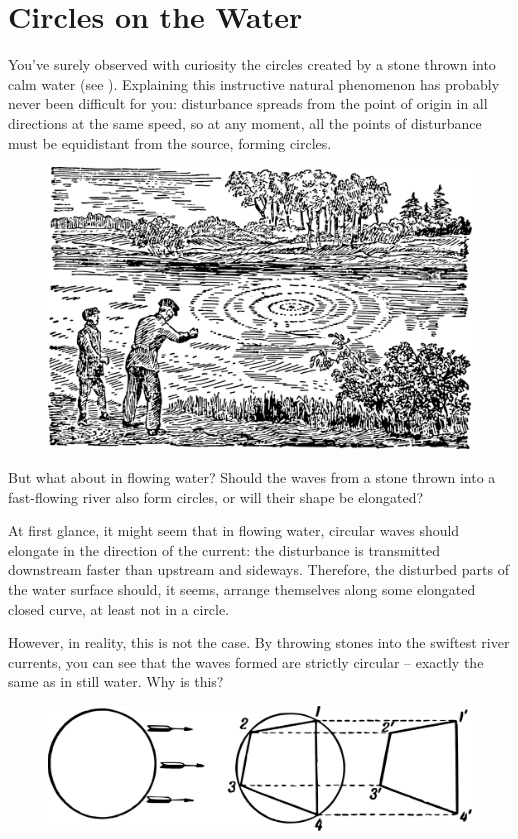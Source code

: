 \section{Circles on the Water}
\label{sec-2.11}
\ques You've surely observed with curiosity the circles created by a stone thrown into calm water (see ). Explaining this instructive natural phenomenon has probably never been difficult for you: disturbance spreads from the point of origin in all directions at the same speed, so at any moment, all the points of disturbance must be equidistant from the source, forming circles.

\begin{figure}[h!]
\centering
\includegraphics[width=\textwidth]{figures/ch-02/fig-046.pdf}
\end{figure}


But what about in flowing water? Should the waves from a stone thrown into a fast-flowing river also form circles, or will their shape be elongated?

At first glance, it might seem that in flowing water, circular waves should elongate in the direction of the current: the disturbance is transmitted downstream faster than upstream and sideways. Therefore, the disturbed parts of the water surface should, it seems, arrange themselves along some elongated closed curve, at least not in a circle.

However, in reality, this is not the case. By throwing stones into the swiftest river currents, you can see that the waves formed are strictly circular -- exactly the same as in still water. Why is this?

\begin{figure}[h!]
\centering
\includegraphics[width=\textwidth]{figures/ch-02/fig-047.pdf}
\end{figure}

